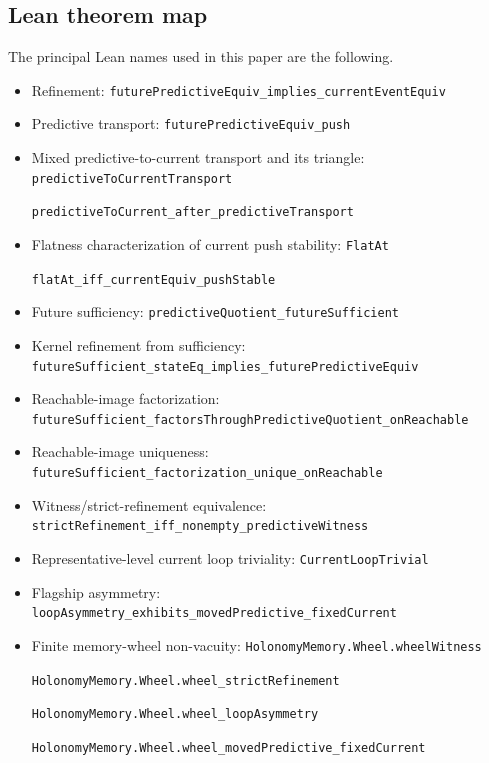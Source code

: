 \documentclass[11pt]{article}
\theoremstyle{definition}
\begin{document}
\subsection{Lean theorem map}\label{appsubsec:lean-theorem-map}
The principal Lean names used in this paper are the following.
\begin{itemize}[leftmargin=*]\small
\item Refinement:
\nolinkurl{futurePredictiveEquiv_implies_currentEventEquiv}

\item Predictive transport:
\nolinkurl{futurePredictiveEquiv_push}

\item Mixed predictive-to-current transport and its triangle:
\nolinkurl{predictiveToCurrentTransport}

\nolinkurl{predictiveToCurrent_after_predictiveTransport}

\item Flatness characterization of current push stability:
\nolinkurl{FlatAt}

\nolinkurl{flatAt_iff_currentEquiv_pushStable}

\item Future sufficiency:
\nolinkurl{predictiveQuotient_futureSufficient}

\item Kernel refinement from sufficiency:
\nolinkurl{futureSufficient_stateEq_implies_futurePredictiveEquiv}

\item Reachable-image factorization:
\nolinkurl{futureSufficient_factorsThroughPredictiveQuotient_onReachable}

\item Reachable-image uniqueness:
\nolinkurl{futureSufficient_factorization_unique_onReachable}

\item Witness/strict-refinement equivalence:
\nolinkurl{strictRefinement_iff_nonempty_predictiveWitness}

\item Representative-level current loop triviality:
\nolinkurl{CurrentLoopTrivial}

\item Flagship asymmetry:
\nolinkurl{loopAsymmetry_exhibits_movedPredictive_fixedCurrent}

\item Finite memory-wheel non-vacuity:
\nolinkurl{HolonomyMemory.Wheel.wheelWitness}

\nolinkurl{HolonomyMemory.Wheel.wheel_strictRefinement}

\nolinkurl{HolonomyMemory.Wheel.wheel_loopAsymmetry}

\nolinkurl{HolonomyMemory.Wheel.wheel_movedPredictive_fixedCurrent}
\end{itemize}
\end{document}
